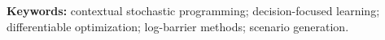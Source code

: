 \documentclass{article}
\begin{document}
\noindent\textbf{Keywords:} contextual stochastic programming; decision-focused learning; differentiable optimization; log-barrier methods; scenario generation.



\end{document}
